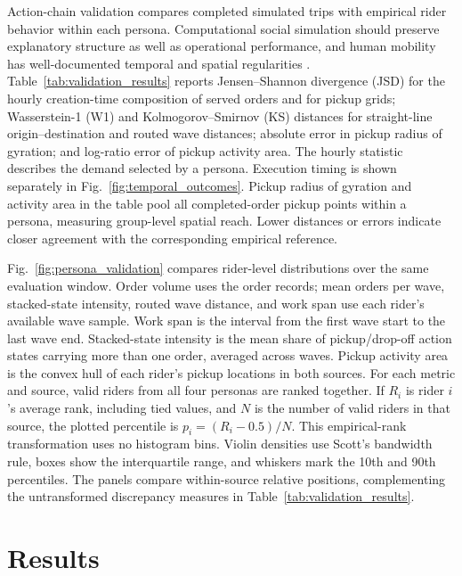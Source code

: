 \documentclass[letterpaper,journal]{IEEEtran}
\begin{document}
Action-chain validation compares completed simulated trips with empirical rider behavior within each persona. Computational social simulation should preserve explanatory structure as well as operational performance, and human mobility has well-documented temporal and spatial regularities \cite{hofmanIntegratingExplanationPrediction2021,gonzalezUnderstandingIndividualHuman2008,songLimitsPredictabilityHuman2010}. Table~\ref{tab:validation_results} reports Jensen--Shannon divergence (JSD) for the hourly creation-time composition of served orders and for pickup grids; Wasserstein-1 (W1) and Kolmogorov--Smirnov (KS) distances for straight-line origin--destination and routed wave distances; absolute error in pickup radius of gyration; and log-ratio error of pickup activity area. The hourly statistic describes the demand selected by a persona. Execution timing is shown separately in Fig.~\ref{fig:temporal_outcomes}. Pickup radius of gyration and activity area in the table pool all completed-order pickup points within a persona, measuring group-level spatial reach. Lower distances or errors indicate closer agreement with the corresponding empirical reference.

Fig.~\ref{fig:persona_validation} compares rider-level distributions over the same evaluation window. Order volume uses the order records; mean orders per wave, stacked-state intensity, routed wave distance, and work span use each rider's available wave sample. Work span is the interval from the first wave start to the last wave end. Stacked-state intensity is the mean share of pickup/drop-off action states carrying more than one order, averaged across waves. Pickup activity area is the convex hull of each rider's pickup locations in both sources. For each metric and source, valid riders from all four personas are ranked together. If $R_i$ is rider $i$'s average rank, including tied values, and $N$ is the number of valid riders in that source, the plotted percentile is $p_i=(R_i-0.5)/N$. This empirical-rank transformation uses no histogram bins. Violin densities use Scott's bandwidth rule, boxes show the interquartile range, and whiskers mark the 10th and 90th percentiles. The panels compare within-source relative positions, complementing the untransformed discrepancy measures in Table~\ref{tab:validation_results}.

\section{Results}
\end{document}
